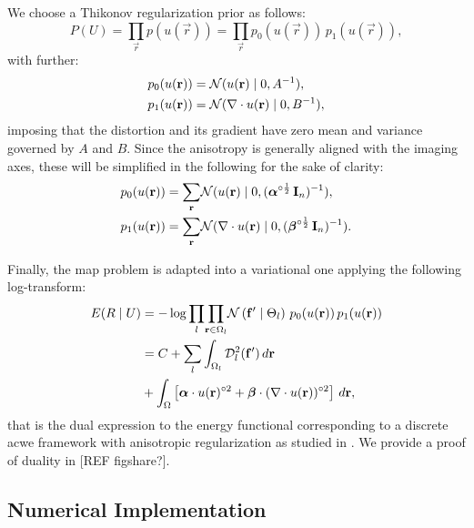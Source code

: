 We choose a Thikonov regularization prior as follows:
  \begin{equation*}
  P(U) = \underset{\vec{r}}{\prod} p(u(\vec{r})) =
  \underset{\vec{r}}{\prod} p_0(u(\vec{r})) \, p_1(u(\vec{r})),
  \end{equation*}
  with further:
  \begin{align*}
  p_0(u(\vec{r})) &= \mathcal{N}( u(\vec{r}) \mid 0, A^{-1}), \notag\\
  p_1(u(\vec{r})) &= \mathcal{N}(  \nabla \cdot u(\vec{r}) \mid 0, B^{-1}),
  \end{align*}
  imposing that the distortion and its gradient have zero
  mean and variance governed by $A$ and $B$.
Since the anisotropy is generally aligned with the imaging axes, these will be simplified
  in the following for the sake of clarity:
  \begin{align}
    p_0(u(\vec{r})) &= \underset{\vec{r}}{\sum} \mathcal{N}( u(\vec{r}) \mid 0,
      (\boldsymbol{\alpha}^{\circ\frac12}\,\vec{I}_n)^{-1}), \notag\\
    p_1(u(\vec{r})) &= \underset{\vec{r}}{\sum} \mathcal{N}( \nabla \cdot u(\vec{r}) \mid 0,
      (\boldsymbol{\beta}^{\circ\frac12}\,\vec{I}_n)^{-1}).
  \label{eq:priors}
  \end{align}

Finally, the \gls{map} problem is adapted into a variational one applying the
  following log-transform:
  \begin{align}
  E(R \mid U) &= -\log \underset{l}{\prod}
  \underset{\vec{r} \in \Omega_l}{\prod}
  \mathcal{N} \left( \vec{f}' \mid \Theta_l \right)\,p_0( u(\vec{r}))\,p_1( u(\vec{r})) \notag\\
  &= C + \underset{l}{\sum} \int_{\Omega_l}
  \mdist{f'}{l} \,d\vec{r} \notag\\
  &+ \int_{\Omega} \left[ \boldsymbol{\alpha} \cdot u(\vec{r})^{\circ2}
  + \boldsymbol{\beta} \cdot (\nabla \cdot u(\vec{r}))^{\circ2} \right] \,d\vec{r},
  \label{eq:energy}
  \end{align}
  that is the dual expression to the energy functional corresponding
  to a discrete \gls*{acwe} framework \citep{chan_active_2001}
  with anisotropic regularization as studied in
  \citep{nagel_investigation_1986}.
We provide a proof of duality in {\color{red} [REF figshare?]}.


\subsection{Numerical Implementation}
\label{sec:numerical_implementation}


